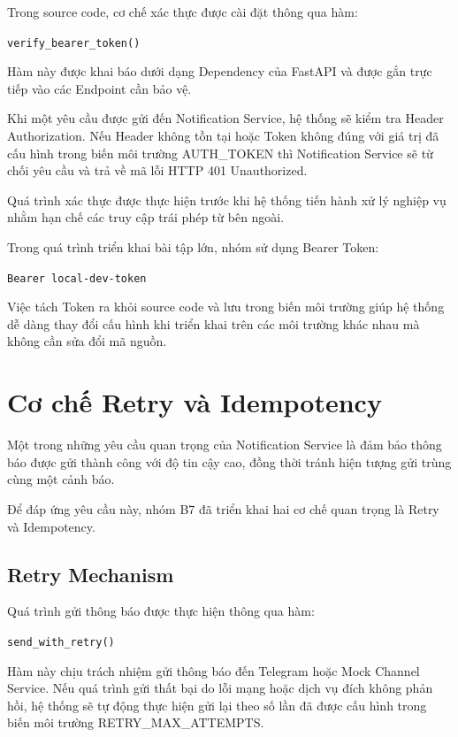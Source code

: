 Trong source code, cơ chế xác thực được cài đặt thông qua hàm:

\begin{center}
\texttt{verify\_bearer\_token()}
\end{center}

Hàm này được khai báo dưới dạng Dependency của FastAPI và được gắn trực tiếp vào các Endpoint cần bảo vệ.

Khi một yêu cầu được gửi đến Notification Service, hệ thống sẽ kiểm tra Header Authorization. Nếu Header không tồn tại hoặc Token không đúng với giá trị đã cấu hình trong biến môi trường AUTH\_TOKEN thì Notification Service sẽ từ chối yêu cầu và trả về mã lỗi HTTP 401 Unauthorized.

Quá trình xác thực được thực hiện trước khi hệ thống tiến hành xử lý nghiệp vụ nhằm hạn chế các truy cập trái phép từ bên ngoài.

Trong quá trình triển khai bài tập lớn, nhóm sử dụng Bearer Token:

\begin{center}
\texttt{Bearer local-dev-token}
\end{center}

Việc tách Token ra khỏi source code và lưu trong biến môi trường giúp hệ thống dễ dàng thay đổi cấu hình khi triển khai trên các môi trường khác nhau mà không cần sửa đổi mã nguồn.


\section{Cơ chế Retry và Idempotency}

Một trong những yêu cầu quan trọng của Notification Service là đảm bảo thông báo được gửi thành công với độ tin cậy cao, đồng thời tránh hiện tượng gửi trùng cùng một cảnh báo.

Để đáp ứng yêu cầu này, nhóm B7 đã triển khai hai cơ chế quan trọng là Retry và Idempotency.

\subsection{Retry Mechanism}

Quá trình gửi thông báo được thực hiện thông qua hàm:

\begin{center}
\texttt{send\_with\_retry()}
\end{center}

Hàm này chịu trách nhiệm gửi thông báo đến Telegram hoặc Mock Channel Service. Nếu quá trình gửi thất bại do lỗi mạng hoặc dịch vụ đích không phản hồi, hệ thống sẽ tự động thực hiện gửi lại theo số lần đã được cấu hình trong biến môi trường RETRY\_MAX\_ATTEMPTS.

